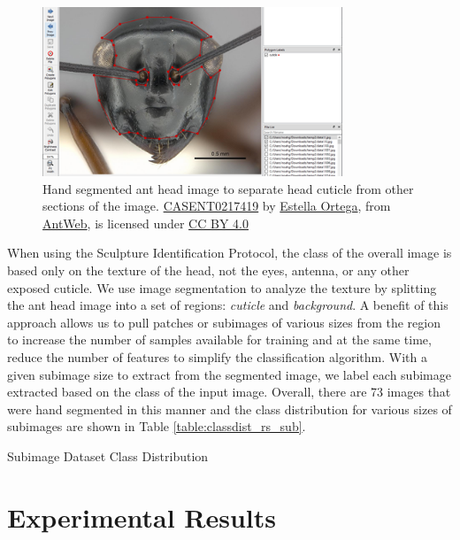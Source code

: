 \documentclass{aci}
\begin{document}
\begin{figure}[ht]
  \centering
  \includegraphics[width=0.8\textwidth]{assets/images/segmented_1.png}
  \caption{Hand segmented ant head image to separate head cuticle from other
    sections of the image.
    \href{https://www.antweb.org/bigPicture.do?name=casent0217419&shot=h&number=1}{CASENT0217419}
    by \href{https://www.antweb.org/artist.do?id=92}{Estella Ortega}, from
    \href{https://www.antweb.org}{AntWeb}, is licensed under
    \href{https://creativecommons.org/licenses/by/4.0/}{CC BY 4.0}}
  \label{fig:segmented_1}
\end{figure}

When using the Sculpture Identification Protocol, the class of the overall image
is based only on the texture of the head, not the eyes, antenna, or any other
exposed cuticle. We use image segmentation to analyze the texture by splitting
the ant head image into a set of regions: \textit{cuticle} and
\textit{background}. A benefit of this approach allows us to pull patches or
subimages of various sizes from the region to increase the number of samples
available for training and at the same time, reduce the number of features to
simplify the classification algorithm. With a given subimage size to extract
from the segmented image, we label each subimage extracted based on the class of
the input image. Overall, there are 73 images that were hand segmented in this
manner and the class distribution for various sizes of subimages are shown in
Table \ref{table:classdist_rs_sub}.

\begin{table}[ht]
  \centering
  \caption{Subimage Dataset Class Distribution}
  \label{table:classdist_rs_sub}
  
\end{table}

\section{Experimental Results}
\end{document}
